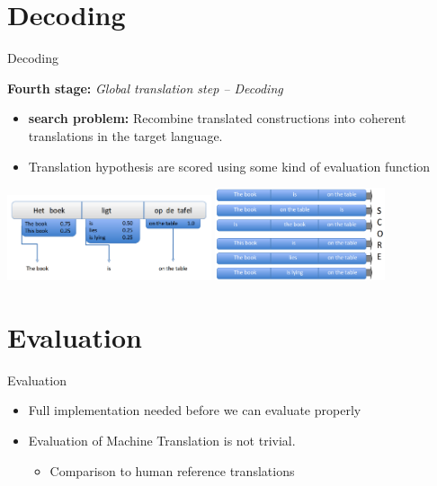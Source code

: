 \documentclass[compress]{beamer}
\begin{document}
\section{Decoding}

\begin{frame}
	\begin{block}{Decoding}

		\textbf{Fourth stage:} \emph{Global translation step -- Decoding} \\

		\begin{itemize}
			\item \textbf{search problem:} Recombine translated constructions into coherent translations in the target language.		
			\item Translation hypothesis are scored using some kind of evaluation function
		\end{itemize}


	\end{block}

	\begin{center}
		 \includegraphics[width=60.0mm]{decoder1.png} 
		 \includegraphics[width=50.0mm]{decoder_score.png} 
	\end{center}

\end{frame}


\section{Evaluation}

\begin{frame}
	\begin{block}{Evaluation}

		\begin{itemize}
			\item Full implementation needed before we can evaluate properly
			\item Evaluation of Machine Translation is not trivial.
			\begin{itemize}
				\item Comparison to human reference translations
			\end{itemize}
		\end{itemize}

	\end{block}
\end{frame}
\end{document}
